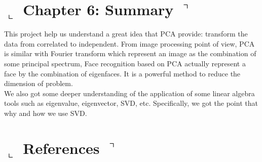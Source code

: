 \documentclass[]{article}
\begin{document}
\section*{ $\llcorner$  Chapter 6: Summary $\urcorner$}

This project help us understand a great idea that PCA provide: transform the data from correlated to independent. From image processing point of view, PCA is similar with Fourier transform which represent an image as the combination of some principal spectrum, Face recognition based on PCA actually represent a face by the combination of eigenfaces. It is a powerful method to reduce the dimension of problem.
\\

We also got some deeper understanding of the application of some linear algebra tools such as eigenvalue, eigenvector, SVD, etc. Specifically, we got the point that why and how we use SVD. 

\section*{ $\llcorner$  References $\urcorner$}
\end{document}
